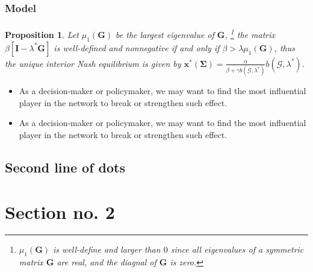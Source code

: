 \documentclass{beamer}
\newtheorem{propo}{Proposition}
\begin{document}
\begin{frame}[label=current]
    \frametitle{Model}
    \framesubtitle{}
    \begin{propo}
        Let $\mu_1(\bm{G})$ be the largest eigenvalue of $\bm{G}$,
        \footnote{$\mu_1(\bm{G})$ is well-define and larger than $0$ since all eigenvalues
        of a symmetric matrix $\bm{G}$ are real, and the diagnal of $\bm{G}$ is zero.}
        the matrix $\beta[\bm{I}-\lambda^*\bm{G}]$ is well-defined and nonnegative
        if and only if $\beta>\lambda\mu_1(\bm{G})$, thus the unique interior Nash equilibrium
        is given by $\bm{x}^*(\bm{\Sigma})=\frac{\alpha}{\beta+\gamma b(\mathscr{G},\lambda^*)}
        b(\mathscr{G},\lambda^*)$.
    \end{propo}
    \begin{itemize}
        \item As a decision-maker or policymaker, we may want to find the most
        influential player in the network to break or strengthen such effect.
        \item As a decision-maker or policymaker, we may want to find the most
           influential player in the network to break or strengthen such effect.
    \end{itemize}
\end{frame}
\subsection{Second line of dots} %

\section{Section no. 2} 

\begin{frame}[allowframebreaks]
    
\end{frame}
\end{document}
